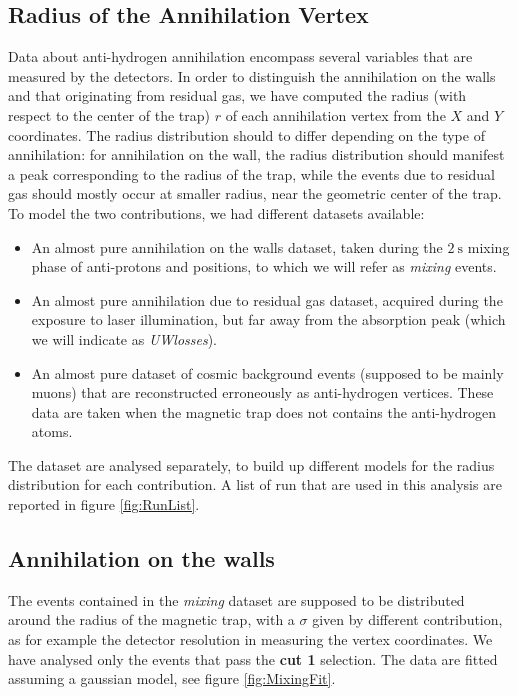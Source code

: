 \documentclass[11pt,a4paper,twocolumn]{article}
\begin{document}
\subsection*{Radius of the Annihilation Vertex}

Data about anti-hydrogen annihilation encompass several variables that are measured by the detectors. In order to distinguish the annihilation on the walls and that originating from residual gas, we have computed the radius (with respect to the center of the trap) $r$ of each annihilation vertex from the $X$ and $Y$ coordinates.
The radius distribution should to differ depending on the type of annihilation: for annihilation on the wall, the radius distribution should manifest a peak corresponding to the radius of the trap, while the events due to residual gas should mostly occur at smaller radius, near the geometric center of the trap.
To model the two contributions, we had different datasets available: 
\begin{itemize}
\item An almost pure annihilation on the walls dataset, taken during the $\SI{2}{\second}$ mixing phase of anti-protons and positions, to which we will refer as \textit{mixing} events.
\item An almost pure annihilation due to residual gas dataset, acquired during the exposure to laser illumination, but far away from the absorption peak (which we will indicate as \textit{UWlosses}).
\item An almost pure dataset of cosmic background events (supposed to be mainly muons) that are reconstructed erroneously as anti-hydrogen vertices. These data are taken when the magnetic trap does not contains the anti-hydrogen atoms.
\end{itemize}

The dataset are analysed separately, to build up different models for the radius distribution for each contribution. A list of run that are used in this analysis are reported in figure \ref{fig:RunList}.

\subsection*{Annihilation on the walls}

The events contained in the \textit{mixing} dataset are supposed to be distributed around the radius of the magnetic trap, with a $\sigma$ given by different contribution, as for example the detector resolution in measuring the vertex coordinates. We have analysed only the events that pass the \textbf{cut 1} selection. The data are fitted assuming a gaussian model, see figure \ref{fig:MixingFit}.
\end{document}
